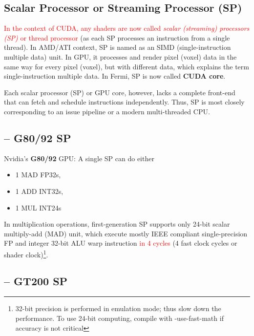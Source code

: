 

\subsection{Scalar Processor or Streaming Processor (SP)}
\label{sec:stre-proc-sp}

\textcolor{red}{In the context of CUDA, any shaders are now called {\it scalar
(streaming) processors (SP)} or thread processor} (as each SP processes an
instruction from a single thread). In AMD/ATI context, SP is named as an SIMD
(single-instruction multiple data) unit. In GPU, it processes and render pixel
(voxel) data in the same way for every pixel (voxel), but with different data,
which explains the term single-instruction multiple data. In Fermi, SP is now
called {\bf CUDA core}.


Each scalar processor (SP) or GPU core, however, lacks a complete front-end that
can fetch and schedule instructions independently.  Thus, SP is most closely
corresponding to an issue pipeline or a modern multi-threaded CPU.

\subsection{-- G80/92 SP}

Nvidia's {\bf G80/92} GPU: A single SP can do either
\begin{itemize}
\item 1 MAD FP32s, 
\item 1 ADD INT32s, 
\item 1 MUL INT24s
\end{itemize}

In multiplication operations, first-generation SP supports only 24-bit
scalar multiply-add (MAD) unit, which execute mostly IEEE compliant
single-precision FP and integer 32-bit ALU warp instruction
\textcolor{red}{in 4 cycles} (4 fast clock cycles or shader
clock)\footnote{32-bit precision is performed in emulation mode; thus
  slow down the performance. To use 24-bit computing, compile with
  -use-fast-math if accuracy is not critical}.

\subsection{-- GT200 SP}

